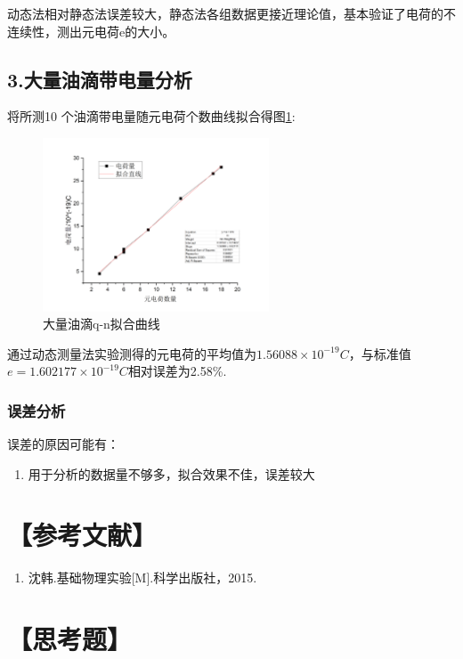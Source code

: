 \documentclass[12pt,a4paper,UTF8]{ctexart}
\begin{document}
动态法相对静态法误差较大，静态法各组数据更接近理论值，基本验证了电荷的不连续性，测出元电荷e的大小。

\subsection*{3.大量油滴带电量分析}

将所测10 个油滴带电量随元电荷个数曲线拟合得图\ref*{fig:3}:

\begin{figure}[!h]
	\centering
	\includegraphics[width=0.6\textwidth]{img//3.png}
	\caption{大量油滴q-n拟合曲线}
	\label{fig:3}
\end{figure}

通过动态测量法实验测得的元电荷的平均值为$1.56088 \times 10^{-19}C$，与标准值$e =1.602177\times 10^{-19}C$相对误差为2.58\%.

\subsubsection*{误差分析}
误差的原因可能有：
\begin{enumerate}
	\item 用于分析的数据量不够多，拟合效果不佳，误差较大
\end{enumerate}

\section*{【参考文献】}
\begin{enumerate}
	\item 沈韩.基础物理实验[M].科学出版社，2015.
\end{enumerate}

\newpage
\section*{【思考题】}
\end{document}
